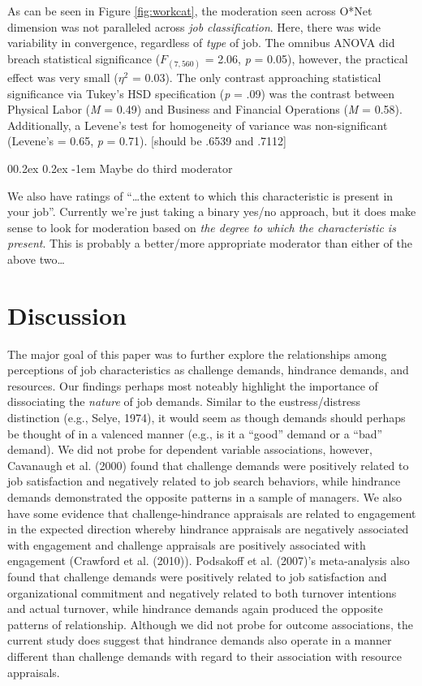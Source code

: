 \documentclass[
  man]{apa6}
\makeatletter
\let\oldparagraph\paragraph
\renewcommand{\paragraph}[1]{\oldparagraph{#1}\mbox{}}
\renewcommand{\paragraph}{\@startsection{paragraph}{4}{\parindent}%
  {0\baselineskip \@plus 0.2ex \@minus 0.2ex}%
  {-1em}%
  {\normalfont\normalsize\bfseries\itshape\typesectitle}}
\makeatother
\begin{document}
As can be seen in Figure \ref{fig:workcat}, the moderation seen across O*Net dimension was not paralleled across \emph{job classification}. Here, there was wide variability in convergence, regardless of \emph{type} of job. The omnibus ANOVA did breach statistical significance (\(F_{(7, 560)}\) = 2.06, \emph{p} = 0.05), however, the practical effect was very small (\(\eta^2\) = 0.03). The only contrast approaching statistical significance via Tukey's HSD specification (\emph{p} = .09) was the contrast between Physical Labor (\emph{M} = 0.49) and Business and Financial Operations (\emph{M} = 0.58). Additionally, a Levene's test for homogeneity of variance was non-significant (Levene's = 0.65, \emph{p} = 0.71). {[}should be .6539 and .7112{]}

\hypertarget{maybe-do-third-moderator}{%
\paragraph{Maybe do third moderator}\label{maybe-do-third-moderator}}

We also have ratings of ``\ldots the extent to which this characteristic is present in your job''. Currently we're just taking a binary yes/no approach, but it does make sense to look for moderation based on \emph{the degree to which the characteristic is present}. This is probably a better/more appropriate moderator than either of the above two\ldots{}

\hypertarget{discussion}{%
\section{Discussion}\label{discussion}}

The major goal of this paper was to further explore the relationships among perceptions of job characteristics as challenge demands, hindrance demands, and resources. Our findings perhaps most noteably highlight the importance of dissociating the \emph{nature} of job demands. Similar to the eustress/distress distinction (e.g., Selye, 1974), it would seem as though demands should perhaps be thought of in a valenced manner (e.g., is it a ``good'' demand or a ``bad'' demand). We did not probe for dependent variable associations, however, Cavanaugh et al. (2000) found that challenge demands were positively related to job satisfaction and negatively related to job search behaviors, while hindrance demands demonstrated the opposite patterns in a sample of managers. We also have some evidence that challenge-hindrance appraisals are related to engagement in the expected direction whereby hindrance appraisals are negatively associated with engagement and challenge appraisals are positively associated with engagement (Crawford et al. (2010)). Podsakoff et al. (2007)'s meta-analysis also found that challenge demands were positively related to job satisfaction and organizational commitment and negatively related to both turnover intentions and actual turnover, while hindrance demands again produced the opposite patterns of relationship. Although we did not probe for outcome associations, the current study does suggest that hindrance demands also operate in a manner different than challenge demands with regard to their association with resource appraisals.
\end{document}
